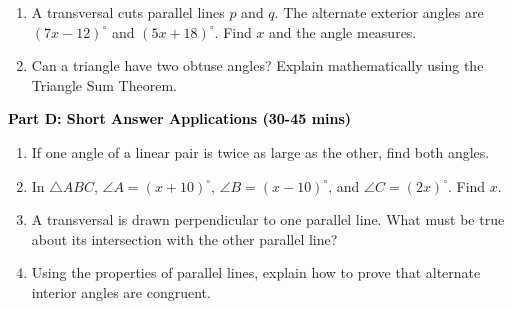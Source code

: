 \documentclass[12pt, letterpaper, fleqn]{article}
\begin{document}
\vspace{3mm}

\begin{enumerate}[itemsep=4.2cm, leftmargin=0.6cm, resume]
\item A transversal cuts parallel lines $p$ and $q$. The alternate exterior angles are $(7x - 12)^\circ$ and $(5x + 18)^\circ$. Find $x$ and the angle measures.
\item Can a triangle have two obtuse angles? Explain mathematically using the Triangle Sum Theorem.
\end{enumerate}

\newpage

\begin{tcolorbox}[colback=customteal!20]
\large\textcolor{black}{\textbf{Part D: Short Answer Applications (30-45 mins)}}
\end{tcolorbox}

\vspace{3mm}

\begin{enumerate}[itemsep=4.2cm, leftmargin=0.6cm, resume]
\item If one angle of a linear pair is twice as large as the other, find both angles.
\item In $\triangle ABC$, $\angle A = (x+10)^\circ$, $\angle B = (x-10)^\circ$, and $\angle C = (2x)^\circ$. Find $x$.
\item A transversal is drawn perpendicular to one parallel line. What must be true about its intersection with the other parallel line?
\item Using the properties of parallel lines, explain how to prove that alternate interior angles are congruent.
\end{enumerate}
\end{document}
